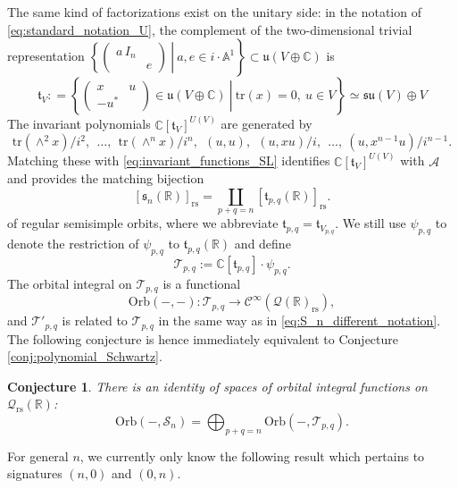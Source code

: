 \documentclass[reqno, 11pt]{amsart} %
\numberwithin{equation}{section}
\theoremstyle{plain}
\newtheorem{conjecture}[theorem]{Conjecture}
\theoremstyle{definition}
\theoremstyle{remark}
\newcommand{\mr}{\mathrm}
\newcommand{\tr}{\mathrm{tr}}
\newcommand{\lr}{\longrightarrow}
\newcommand{\mbA}{\mathbb{A}}
\newcommand{\mbC}{\mathbb{C}}
\newcommand{\mbR}{\mathbb{R}}
\newcommand{\mcA}{\mathcal{A}}
\newcommand{\mcC}{\mathcal{C}}
\newcommand{\mcQ}{\mathcal{Q}}
\newcommand{\mcS}{\mathcal{S}}
\newcommand{\mcT}{\mathcal{T}}
\newcommand{\mfu}{\mathfrak{u}}
\newcommand{\rs}{\mr{rs}}
\newcommand{\lie}[1]{ \mathfrak{#1}}
\newcommand{\Orb}{\mathrm{Orb}}
\begin{document}
The  same kind of factorizations exist on the unitary side: in the notation of \eqref{eq:standard_notation_U}, the complement of the two-dimensional trivial representation $\left.\left\{\left(\begin{smallmatrix} a \, I_n & \\ & e \end{smallmatrix}\right)\ \right\vert\ a,e\in i\cdot \mbA^1\right\} \subset \mfu(V\oplus \mbC)$ is
\begin{equation}\label{eq:intro_su_setting}
\lie t_{V}: = \left\{\left.\begin{pmatrix}
x & u \\ -u^* &
\end{pmatrix} \in \mfu(V\oplus \mbC) \ \right\vert\ \tr(x) = 0, \ u \in V \right\} \simeq \lie{su}(V) \oplus V
\end{equation}
The invariant polynomials $\mbC[\lie t_V]^{U(V)}$ are generated by
\begin{equation}\label{eq:invariant_functions_SU}
\tr(\wedge^2 x)/i^2,\ \ \ldots,\ \ \tr(\wedge^n x)/i^n,\ \ (u,u),\ \ (u,xu)/i,\ \ \ldots,\ (u,x^{n-1}u)/i^{n-1}.
\end{equation}
Matching these with \eqref{eq:invariant_functions_SL} identifies $\mbC[\lie t_V]^{U(V)}$ with $\mcA$ and provides the matching bijection
$$[\lie s_n(\mbR)]_{\rs} = \coprod_{p + q = n} [\lie t_{p,q}(\mbR)]_{\rs}.$$
of regular semisimple orbits, where we abbreviate $\lie t_{p,q} = \lie t_{V_{p,q}}$. We still use $ψ_{p,q}$ to denote the restriction of $ψ_{p,q}$ to $\lie t_{p,q}(\mbR)$ and define
\begin{equation}\label{eq:def_Tpq}
\mcT_{p,q} := \mbC[\lie t_{p,q}]\cdot ψ_{p,q}.
\end{equation}
The orbital integral on $\mcT_{p,q}$ is a functional
$$\Orb(-,-):\mcT_{p,q}\lr \mcC^\infty(\mcQ(\mbR)_\rs),$$
and $\mcT'_{p,q}$ is related to $\mcT_{p,q}$ in the same way as in \eqref{eq:S_n_different_notation}. The following conjecture is hence immediately equivalent to Conjecture \ref{conj:polynomial_Schwartz}.
\begin{conjecture}\label{conj:polynomial_Schwartz_SL}
There is an identity of spaces of orbital integral functions on $\mcQ_\rs(\mbR)$:
$$\Orb(-,\mcS_n) = \bigoplus_{p + q = n} \Orb(-,\mcT_{p,q}).$$
\end{conjecture}

For general $n$, we currently only know the following result which pertains to signatures $(n,0)$ and $(0,n)$.
\end{document}
